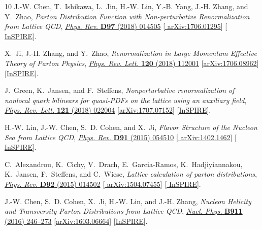 \begin{thebibliography}{10}
J.-W. Chen, T.~Ishikawa, L.~Jin, H.-W. Lin, Y.-B. Yang, J.-H. Zhang, and
  Y.~Zhao, {\it {Parton Distribution Function with Non-perturbative
  Renormalization from Lattice QCD}},
\href{http://dx.doi.org/10.1103/PhysRevD.97.014505}{{\em Phys. Rev.} {\bfseries
  D97} (2018) 014505} [\href{http://arxiv.org/abs/1706.01295}{{\ttfamily
  arXiv:1706.01295}}] [\href{http://inspirehep.net/record/1602626}{{\ttfamily
  InSPIRE}}].

X.~Ji, J.-H. Zhang, and Y.~Zhao, {\it {Renormalization in Large Momentum
  Effective Theory of Parton Physics}},
\href{http://dx.doi.org/10.1103/PhysRevLett.120.112001}{{\em Phys. Rev. Lett.}
  {\bfseries 120} (2018) 112001}
  [\href{http://arxiv.org/abs/1706.08962}{{\ttfamily arXiv:1706.08962}}]
  [\href{http://inspirehep.net/record/1607797}{{\ttfamily InSPIRE}}].

J.~Green, K.~Jansen, and F.~Steffens, {\it {Nonperturbative renormalization of
  nonlocal quark bilinears for quasi-PDFs on the lattice using an auxiliary
  field}},
\href{http://dx.doi.org/10.1103/PhysRevLett.121.022004}{{\em Phys. Rev. Lett.}
  {\bfseries 121} (2018) 022004}
  [\href{http://arxiv.org/abs/1707.07152}{{\ttfamily arXiv:1707.07152}}]
  [\href{http://inspirehep.net/record/1611305}{{\ttfamily InSPIRE}}].

H.-W. Lin, J.-W. Chen, S.~D. Cohen, and X.~Ji, {\it {Flavor Structure of the
  Nucleon Sea from Lattice QCD}},
\href{http://dx.doi.org/10.1103/PhysRevD.91.054510}{{\em Phys. Rev.} {\bfseries
  D91} (2015) 054510} [\href{http://arxiv.org/abs/1402.1462}{{\ttfamily
  arXiv:1402.1462}}] [\href{http://inspirehep.net/record/1280317}{{\ttfamily
  InSPIRE}}].

C.~Alexandrou, K.~Cichy, V.~Drach, E.~Garcia-Ramos, K.~Hadjiyiannakou,
  K.~Jansen, F.~Steffens, and C.~Wiese, {\it {Lattice calculation of parton
  distributions}},
\href{http://dx.doi.org/10.1103/PhysRevD.92.014502}{{\em Phys. Rev.} {\bfseries
  D92} (2015) 014502} [\href{http://arxiv.org/abs/1504.07455}{{\ttfamily
  arXiv:1504.07455}}] [\href{http://inspirehep.net/record/1365095}{{\ttfamily
  InSPIRE}}].

J.-W. Chen, S.~D. Cohen, X.~Ji, H.-W. Lin, and J.-H. Zhang, {\it {Nucleon
  Helicity and Transversity Parton Distributions from Lattice QCD}},
\href{http://dx.doi.org/10.1016/j.nuclphysb.2016.07.033}{{\em Nucl. Phys.}
  {\bfseries B911} (2016) 246--273}
  [\href{http://arxiv.org/abs/1603.06664}{{\ttfamily arXiv:1603.06664}}]
  [\href{http://inspirehep.net/record/1431989}{{\ttfamily InSPIRE}}].


\end{thebibliography}
